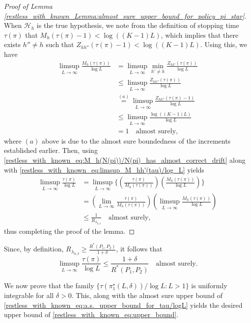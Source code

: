 \begin{proof}[Proof of Lemma \ref{restless_with_known_Lemma:almost_sure_upper_bound_for_policy_pi_star}]
When $\mathcal{H}_h$ is the true hypothesis, we note from the definition of stopping time $\tau(\pi)$ that $M_{h}(\tau(\pi)-1)<\log ((K-1)L)$, which implies that there exists $h''
\neq h$ such that $Z_{hh''}(\tau(\pi)-1)<\log((K-1)L)$. Using this, we have
\begingroup\allowdisplaybreaks\begin{align}
	\limsup\limits_{L\to\infty}\frac{M_{h}(\tau(\pi))}{\log L}&=\limsup\limits_{L\to\infty}\min\limits_{h'\neq h}\frac{Z_{hh'}(\tau(\pi))}{\log L}\nonumber\\
	&\leq \limsup\limits_{L\to\infty}\frac{Z_{hh''}(\tau(\pi))}{\log L}\nonumber\\
	&\stackrel{(a)}{=}\limsup\limits_{L\to\infty}\frac{Z_{hh''}(\tau(\pi)-1)}{\log L}\nonumber\\
	&\leq \limsup\limits_{L\to\infty}\frac{\log((K-1)L)}{\log L}\nonumber\\
	&=1\quad \text{almost surely},\label{restless_with_known_eq:limsup_M_hh'(tau)/log_L}
\end{align}\endgroup	
where $(a)$ above is due to the almost sure boundedness of the increments established earlier. Then, using \eqref{restless_with_known_eq:M_h(N(pi))/N(pi)_has_almost_correct_drift} along with \eqref{restless_with_known_eq:limsup_M_hh'(tau)/log_L} yields
\begingroup\allowdisplaybreaks\begin{align}
	\limsup\limits_{L\to\infty}\frac{\tau(\pi)}{\log L}&=\limsup\limits_{L\to\infty}\bigg\lbrace\left(\frac{\tau(\pi)}{M_{h}(\tau(\pi))}\right)\left(\frac{M_{h}(\tau(\pi))}{\log L}\right)\bigg\rbrace \nonumber\\
	&=\left(\lim\limits_{L\to\infty}\frac{\tau(\pi)}{M_{h}(\tau(\pi))}\right)\left(\limsup\limits_{L\to\infty}\frac{M_{h}(\tau(\pi))}{\log L}\right)\nonumber\\
	&\leq \frac{1}{R_{\lambda_{h,\delta}}}\quad \text{almost surely},
\end{align}\endgroup
thus completing the proof of the lemma.
\end{proof}
Since, by definition, $R_{\lambda_{h,\delta}}\geq\frac{R^*(P_1,P_2)}{1+\delta}$, it follows that 
\begin{equation}
	\limsup\limits_{L\to\infty}\frac{\tau(\pi)}{\log L}\leq \frac{1+\delta}{R^*(P_1,P_2)}\quad \text{almost surely}.\label{restless_with_known_eq:a.s._upper_bound_for_tau/logL}
\end{equation}

We now prove that the family $\{\tau(\pi_1^\star(L, \delta))/\log L:L>1\}$ is uniformly integrable for all $\delta>0$. This, along with the almost sure upper bound of \eqref{restless_with_known_eq:a.s._upper_bound_for_tau/logL} yields the desired upper bound of \eqref{restless_with_known_eq:upper_bound}.

